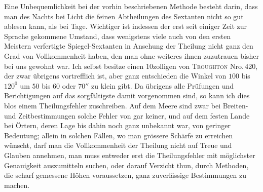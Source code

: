 Eine Unbequemlichkeit bei der vorhin beschriebenen Methode besteht darin,
dass man des Nachts bei Licht die feinen Abtheilungen des Sextanten nicht so
gut ablesen kann, als bei Tage. Wichtiger ist indessen der erst seit einiger Zeit
zur Sprache gekommene Umstand, dass wenigstens viele auch von den ersten
Meistern verfertigte Spiegel-Sextanten in Ansehung der Theilung nicht ganz den
Grad von Vollkommenheit haben, den man ohne weiteres ihnen zuzutrauen bisher
bei uns gewohnt war. Ich selbst besitze einen 10zolligen von \textsc{Troughton}
Nro.\,420, der zwar übrigens vortrefflich ist, aber ganz entschieden die Winkel
von $100$ bis $120^0$ um $50$ bis $60$ oder $70''$ zu klein gibt. Da übrigens alle Prüfungen
und Berichtigungen auf das sorgfältigste damit vorgenommen sind, so
kann ich dies blos einem Theilungsfehler zuschreiben. Auf dem Meere sind
zwar bei Breiten- und Zeitbestimmungen solche Fehler von gar keiner, und auf
dem festen Lande bei Örtern, deren Lage bis dahin noch ganz unbekannt war,
von geringer Bedeutung; allein in solchen Fällen, wo man grössere Schärfe zu
erreichen wünscht, darf man die Vollkommenheit der Theilung nicht auf Treue
und Glauben annehmen, man muss entweder erst die Theilungsfehler mit möglichster
Genauigkeit auszumitteln suchen, oder darauf Verzicht thun, durch Methoden,
die scharf gemessene Höhen voraussetzen, ganz zuverlässige Bestimmungen
zu machen.


